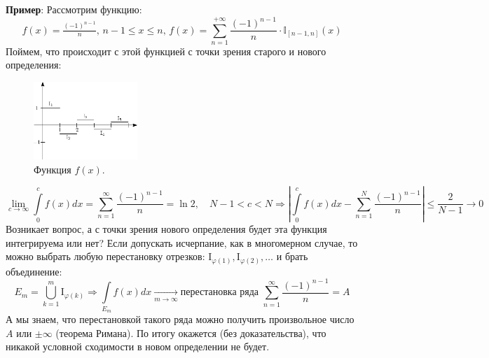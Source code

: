 \documentclass[12pt]{article}
\newcommand{\MTI}{\mathbb{I}}
\newcommand{\MI}{\mathrm{I}}
\theoremstyle{definition}
\newcommand{\ddsum}[2]{\displaystyle\sum\limits_{#1}^{#2}}
\newcommand{\ddint}[2]{\displaystyle\int\limits_{#1}^{#2}}
\begin{document}
\textbf{Пример}: Рассмотрим функцию: 
$$
	f(x) = \tfrac{(-1)^{n-1}}{n}, \, n-1 \leq x \leq n, \, f(x) = \ddsum{n= 1}{+\infty}\dfrac{(-1)^{n-1}}{n}{\cdot}\MTI_{[n-1,n]}(x)
$$ 
Поймем, что происходит с этой функцией с точки зрения старого и нового определения:
\begin{figure}[H]
	\centering
	\includegraphics[width=0.35\textwidth]{MA4L9_1.eps}
	\caption{Функция $f(x)$.}
	\label{9_1}
\end{figure}
$$
	\lim\limits_{c \to \infty}\ddint{0}{c}f(x)dx = \ddsum{n = 1}{\infty}\dfrac{(-1)^{n-1}}{n} = \ln{2}, \quad N-1 < c < N \Rightarrow \left|\ddint{0}{c}f(x)dx - \ddsum{n = 1}{N}\dfrac{(-1)^{n-1}}{n}\right|\leq \dfrac{2}{N-1} \to 0
$$
Возникает вопрос, а с точки зрения нового определения будет эта функция интегрируема или нет? Если допускать исчерпание, как в многомерном случае, то можно выбрать любую перестановку отрезков: $\MI_{\varphi(1)}, \MI_{\varphi(2)}, \dotsc$ и брать объединение:
$$
	E_m = \bigcup\limits_{k = 1}^{m}\MI_{\varphi(k)} \Rightarrow \ddint{E_m}{}f(x)dx \xrightarrow[m \to \infty]{} \text{перестановка ряда } \ddsum{n = 1}{\infty}\dfrac{(-1)^{n-1}}{n} = A
$$
А мы знаем, что перестановкой такого ряда можно получить произвольное число $A$ или $\pm \infty$ (теорема Римана). По итогу окажется (без доказательства), что никакой условной сходимости в новом определении не будет.
\end{document}
